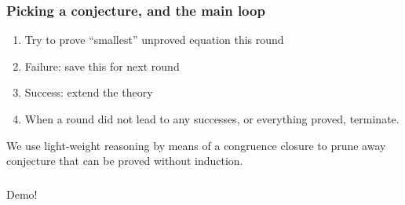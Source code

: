 \documentclass[serif,professionalfont]{beamer}
\begin{document}
\begin{frame}[fragile]
  \frametitle{Picking a conjecture, and the main loop}

  \def\onlyloop{}
  
  \undef\onlyloop

  \begin{enumerate}
    \item Try to prove ``smallest'' unproved equation this round
    \item Failure: save this for next round
    \item Success: extend the theory
    \item When a round did not lead to any successes, or everything proved, terminate.
  \end{enumerate}

  \pause

  We use light-weight reasoning by means of a congruence closure to
  prune away conjecture that can be proved without induction. %

\end{frame}

\begin{frame}
  \frametitle{}
    \begin{center}
    {\color{Purpleee} \Huge Demo!}
    \end{center}
\end{frame}
\end{document}
